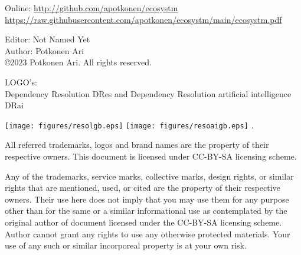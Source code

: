 %
%
%
\label{rights}
\vspace*{\fill}
Online: \url{http://github.com/apotkonen/ecosystm} \cite{Ecosystm}\\
{\scriptsize\url{https://raw.githubusercontent.com/apotkonen/ecosystm/main/ecosystm.pdf}}
\vspace*{\fill}

Editor: Not Named Yet\\
Author: Potkonen Ari\\
\copyright 2023 Potkonen Ari. All rights reserved.
\vspace{\baselineskip}

LOGO's:\\
Dependency Resolution DRes\textsuperscript{\texttrademark}
and Dependency Resolution artificial intelligence
DRai\textsuperscript{\texttrademark}

\texttt{[image: figures/resolgb.eps]}
\texttt{[image: figures/resoaigb.eps]}
.
\vspace*{\fill}

All referred trademarks, logos and brand names are the property of their respective owners. This document is licensed under CC-BY-SA licensing scheme.
\vspace{\baselineskip}

Any of the trademarks, service marks, collective marks, design rights, or similar rights that are mentioned, used, or cited are the property of their respective owners. Their use here does not imply that you may use them for any purpose other than for the same or a similar informational use as contemplated by the original author of document licensed under the CC-BY-SA licensing scheme. Author cannot grant any rights to use any otherwise protected materials. Your use of any such or similar incorporeal property is at your own risk. 


